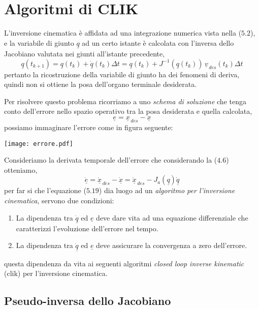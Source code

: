 \section{Algoritmi di CLIK}
L'inversione cinematica è affidata ad una integrazione numerica vista nella ($5.2$), e la variabile di giunto $\underline{q}$ ad un certo istante è calcolata con l'inversa dello Jacobiano valutata nei giunti all'istante precedente,
\begin{equation}
	\underline{q}(t_{k+1}) = \underline{q}(t_k) + \underline{\dot{q}}(t_k)\Delta t = \underline{q}(t_k) + J^{-1}(\underline{q}(t_k))\,\underline{v}_{\,des}(t_k)\Delta t
\end{equation}
pertanto la ricostruzione della variabile di giunto ha dei fenomeni di deriva, quindi non si ottiene la posa dell'organo terminale desiderata.

Per risolvere questo problema ricorriamo a uno \emph{schema di soluzione} che tenga conto dell'errore nello spazio operativo tra la posa desiderata e quella calcolata,
\begin{equation}
	\underline{e} = \underline{x}_{\,des} - \underline{x}
\end{equation}
possiamo immaginare l'errore come in figura seguente:
\begin{center}
	\texttt{[image: errore.pdf]}
\end{center}
Consideriamo la derivata temporale dell'errore che considerando la ($4.6$) otteniamo,
\begin{equation}
	\underline{\dot{e}} = \underline{\dot{x}}_{\,des} - \underline{\dot{x}} = \underline{\dot{x}}_{\,des} - J_a(\underline{q})\underline{\dot{q}}
\end{equation}
per far si che l'equazione ($5.19$) dia luogo ad un \emph{algoritmo per l'inversione cinematica}, servono due condizioni:
\begin{enumerate}
	\item La dipendenza tra $\underline{\dot{q}}$ ed $\underline{e}$ deve dare vita ad una equazione differenziale che caratterizzi l'evoluzione dell'errore nel tempo.
	\item La dipendenza tra $\underline{\dot{q}}$ ed $\underline{e}$ deve assicurare la convergenza a zero dell'errore.
\end{enumerate}
questa dipendenza da vita ai seguenti algoritmi \emph{closed loop inverse kinematic} (clik) per l'inversione cinematica. 

\subsection{Pseudo-inversa dello Jacobiano}
